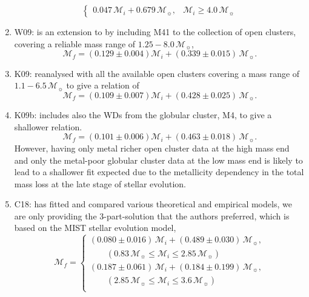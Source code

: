 \documentclass[fleqn,usenatbib]{rasti}
\newcommand{\msun}{\mathcal{M}_{\sun}}
\begin{document}
\begin{enumerate}
\begin{equation}
\begin{cases}
                  0.047\,\mathcal{M}_i + 0.679\,\msun, &\mathcal{M}_i \geq 4.0\,\msun
              \end{cases}
    \end{equation}
    \item W09: \citet{2009ApJ...693..355W} is an extension to \citet{2009ApJ...692.1013S} by including M41 to the collection of open clusters, covering a reliable mass range of $1.25-8.0\,\msun$,
    \begin{equation}
        \mathcal{M}_f = (0.129 \pm 0.004) \mathcal{M}_i + (0.339 \pm 0.015)\,\msun.
    \end{equation}
    \item K09: \citet{2009ApJ...705..408K} reanalysed with all the available open clusters covering a mass range of $1.1-6.5\,\msun$ to give a relation of
    \begin{equation}
        \mathcal{M}_f = (0.109 \pm 0.007) \mathcal{M}_i + (0.428 \pm 0.025)\,\msun.
    \end{equation}
    \item K09b: \citet[][extended]{2009ApJ...705..408K} includes also the WDs from the globular cluster, M4, to give a shallower relation.
    \begin{equation}
        \mathcal{M}_f = (0.101 \pm 0.006) \mathcal{M}_i + (0.463 \pm 0.018)\,\msun.
    \end{equation}
    However, having only metal richer open cluster data at the high mass end and only the metal-poor globular cluster data at the low mass end is likely to lead to a shallower fit expected due to the metallicity dependency in the total mass loss at the late stage of stellar evolution.
    \item C18: \citet{2018ApJ...866...21C} has fitted and compared various theoretical and empirical models, we are only providing the 3-part-solution that the authors preferred, which is based on the MIST stellar evolution model,
    \begin{equation}
        \mathcal{M}_f = \begin{cases}
                  (0.080 \pm 0.016)\,\mathcal{M}_i + (0.489 \pm 0.030)\,\msun,\\
                  \qquad(0.83\,\msun \leq \mathcal{M}_i \leq 2.85\,\msun)\\
                  (0.187 \pm 0.061)\,\mathcal{M}_i + (0.184 \pm 0.199)\,\msun,\\
                  \qquad(2.85\,\msun \leq \mathcal{M}_i \leq 3.6\,\msun)\\

\end{cases}
\end{equation}
\end{enumerate}
\end{document}
